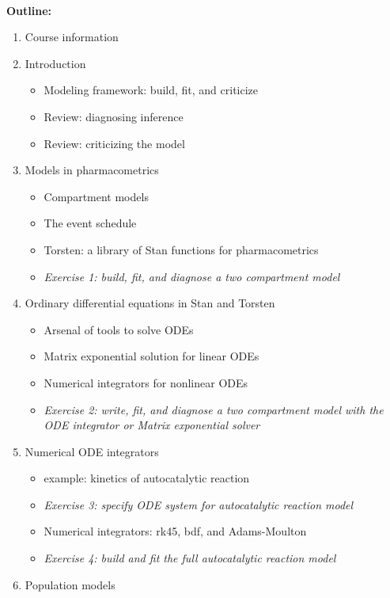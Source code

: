 \documentclass[12pt]{article}
\begin{document}
\ \\
\textbf{Outline:} \\
%
  \begin{enumerate}
  \item Course information
   \item Introduction
   \begin{itemize}
     \item Modeling framework: build, fit, and criticize
     \item Review: diagnosing inference
     \item Review: criticizing the model
   \end{itemize}
   \item Models in pharmacometrics
     \begin{itemize}
       \item Compartment models
       \item The event schedule
       \item Torsten: a library of Stan functions for pharmacometrics
       \item \textit{Exercise 1: build, fit, and diagnose a two compartment model}
     \end{itemize}
   \item Ordinary differential equations in Stan and Torsten
   \begin{itemize}
     \item Arsenal of tools to solve ODEs
     \item Matrix exponential solution for linear ODEs
     \item Numerical integrators for nonlinear ODEs
     \item \textit{Exercise 2: write, fit, and diagnose a two compartment 
     model with the ODE integrator or Matrix exponential solver}
   \end{itemize}
   \item Numerical ODE integrators
   \begin{itemize}
     \item example: kinetics of autocatalytic reaction
     \item \textit{Exercise 3: specify ODE system for autocatalytic reaction model}
     \item Numerical integrators: rk45, bdf, and Adams-Moulton
     \item \textit{Exercise 4: build and fit the full autocatalytic reaction model}
   \end{itemize}
   \item Population models

\end{enumerate}
\end{document}

